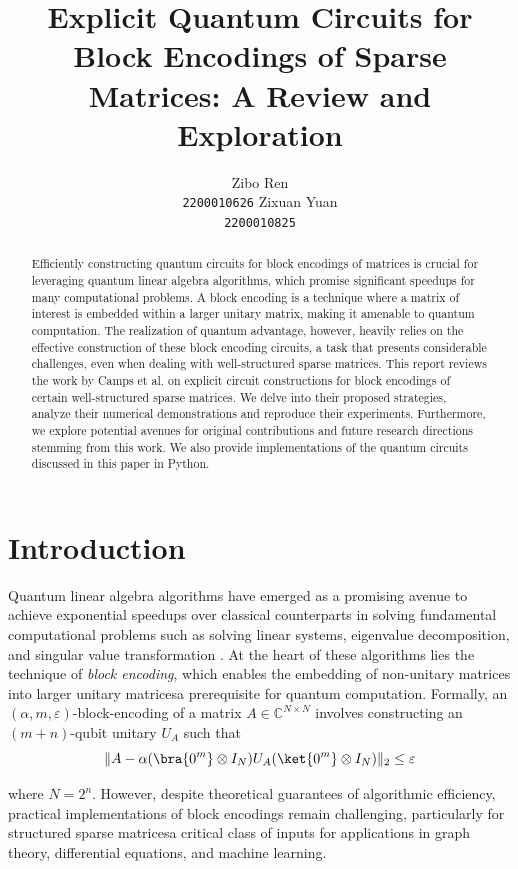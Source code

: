 \documentclass{article}
\title{Explicit Quantum Circuits for Block Encodings of Sparse Matrices: A Review and Exploration}
\author{%
  \large Zibo Ren \\
  \large \texttt{2200010626}
  \And
  \large Zixuan Yuan \\
  \large \texttt{2200010825}
}
\begin{document}
\maketitle

\begin{abstract}

  Efficiently constructing quantum circuits for block encodings of matrices is crucial for leveraging quantum linear algebra algorithms, which promise significant speedups for many computational problems.
  A block encoding is a technique where a matrix of interest is embedded within a larger unitary matrix, making it amenable to quantum computation.
  The realization of quantum advantage, however, heavily relies on the effective construction of these block encoding circuits, a task that presents considerable challenges, even when dealing with well-structured sparse matrices.
  This report reviews the work by Camps et al. \cite{EQC} on explicit circuit constructions for block encodings of certain well-structured sparse matrices.
  We delve into their proposed strategies, analyze their numerical demonstrations and reproduce their experiments.
  Furthermore, we explore potential avenues for original contributions and future research directions stemming from this work.
  We also provide implementations of the quantum circuits discussed in this paper in Python.

\end{abstract}

\section{Introduction}

Quantum linear algebra algorithms have emerged as a promising avenue to achieve exponential speedups over classical counterparts in solving fundamental computational problems such as solving linear systems, eigenvalue decomposition, and singular value transformation \cite{EQC}. At the heart of these algorithms lies the technique of \emph{block encoding}, which enables the embedding of non-unitary matrices into larger unitary matrices\textemdash a prerequisite for quantum computation. Formally, an $(\alpha, m, \varepsilon)$-block-encoding of a matrix $A \in \mathbb{C}^{N \times N}$ involves constructing an $(m+n)$-qubit unitary $U_A$ such that
$$\|A - \alpha(\bra{0^m} \otimes I_N)U_A(\ket{0^m} \otimes I_N)\|_2 \leq \varepsilon$$

where $N=2^n$. However, despite theoretical guarantees of algorithmic efficiency, practical implementations of block encodings remain challenging, particularly for structured sparse matrices\textemdash a critical class of inputs for applications in graph theory, differential equations, and machine learning.
\end{document}
